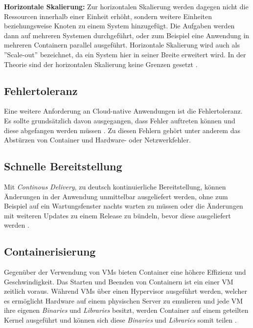 \textbf{Horizontale Skalierung:}
Zur horizontalen Skalierung werden dagegen nicht die Ressourcen innerhalb einer Einheit erhöht, sondern weitere Einheiten beziehungsweise Knoten zu einem System hinzugefügt. Die Aufgaben werden dann auf mehreren Systemen durchgeführt, oder zum Beispiel eine Anwendung in mehreren Containern parallel ausgeführt. Horizontale Skalierung wird auch als ''Scale-out'' bezeichnet, da ein System hier in seiner Breite erweitert wird. In der Theorie sind der horizontalen Skalierung keine Grenzen gesetzt \cite[Vgl.][]{Geißler2019}\cite[Vgl.][]{VMware}.

\subsection{Fehlertoleranz}
Eine weitere Anforderung an Cloud-native Anwendungen ist die Fehlertoleranz. Es sollte grundsätzlich davon ausgegangen, dass Fehler auftreten können und diese abgefangen werden müssen \cite[Vgl.][S. 17]{Gannon2017}. Zu diesen Fehlern gehört unter anderem das Abstürzen von Container und Hardware- oder Netzwerkfehler.

\subsection{Schnelle Bereitstellung}
Mit \textit{Continous Delivery}, zu deutsch kontinuierliche Bereitstellung, können Änderungen in der Anwendung unmittelbar ausgeliefert werden, ohne zum Beispiel auf ein Wartungsfenster nachts warten zu müssen oder die Änderungen mit weiteren Updates zu einem Release zu bündeln, bevor diese ausgeliefert werden \cite[Vgl.][]{VMwareb}. \pagebreak

\subsection{Containerisierung}
Gegenüber der Verwendung von \acp{VM} bieten Container eine höhere Effizienz und Geschwindigkeit. Das Starten und Beenden von Containern ist ein einer \ac{VM} zeitlich voraus. \cite[Vgl.][]{VMwareb}
Während \acp{VM} über einen Hypervisor ausgeführt werden, welcher es ermöglicht Hardware auf einem physischen Server zu emulieren und jede \ac{VM} ihre eigenen \textit{Binaries} und \textit{Libraries} besitzt, werden Container auf einem geteilten Kernel ausgeführt und können sich diese \textit{Binaries} und \textit{Libraries} somit teilen \cite[Vgl.][]{Jones2018}.

